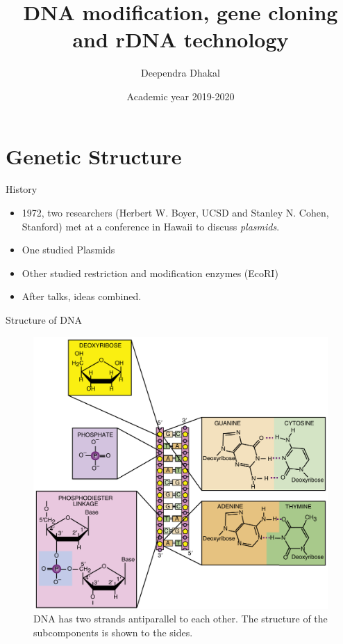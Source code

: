 \documentclass[ignorenonframetext,aspectratio=169]{beamer}
\title{DNA modification, gene cloning and rDNA technology}
\author{Deependra Dhakal}
\institute{GAASC, Baitadi \and Tribhuwan University}
\date{Academic year 2019-2020}
\providecommand{\tightlist}{%
  \setlength{\itemsep}{0pt}\setlength{\parskip}{0pt}}
\begin{document}
\frame{\titlepage}

\begin{frame}
\tableofcontents[hideallsubsections]
\end{frame}
\hypertarget{genetic-structure}{%
\section{Genetic Structure}\label{genetic-structure}}

\begin{frame}{History}
\protect\hypertarget{history}{}

\begin{itemize}
\tightlist
\item
  1972, two researchers (Herbert W. Boyer, UCSD and Stanley N. Cohen,
  Stanford) met at a conference in Hawaii to discuss \emph{plasmids}.
\item
  One studied Plasmids
\item
  Other studied restriction and modification enzymes (EcoRI)
\item
  After talks, ideas combined.
\end{itemize}

\end{frame}

\begin{frame}{Structure of DNA}
\protect\hypertarget{structure-of-dna}{}

\begin{figure}
\includegraphics[width=0.45\linewidth]{./../images/dna_structure_a} \caption{DNA has two strands antiparallel to each other. The structure of the subcomponents is shown to the sides.}\label{fig:nucleic-acid-dna}
\end{figure}

\end{frame}
\end{document}
